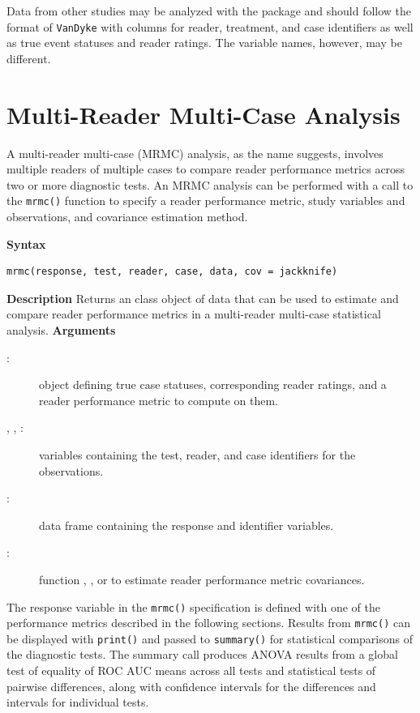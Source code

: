 \documentclass[
]{jss}
\newenvironment{Description}{\textbf{Description}\vspace{0.5em}\newline}{\vspace{0.5em}\newline}
\begin{document}
Data from other studies may be analyzed with the package and should
follow the format of \texttt{VanDyke} with columns for reader,
treatment, and case identifiers as well as true event statuses and
reader ratings. The variable names, however, may be different.

\hypertarget{multi-reader-multi-case-analysis}{%
\section{Multi-Reader Multi-Case
Analysis}\label{multi-reader-multi-case-analysis}}

A multi-reader multi-case (MRMC) analysis, as the name suggests,
involves multiple readers of multiple cases to compare reader
performance metrics across two or more diagnostic tests. An MRMC
analysis can be performed with a call to the \texttt{mrmc()} function to
specify a reader performance metric, study variables and observations,
and covariance estimation method.

\begin{tcolorbox}[title=MRMC Function]
\textbf{Syntax}
\begin{verbatim}
mrmc(response, test, reader, case, data, cov = jackknife)
\end{verbatim}
\begin{Description}
Returns an  class object of data that can be used to estimate and compare reader performance metrics in a multi-reader multi-case statistical analysis.
\end{Description}
\textbf{Arguments}
\begin{description}
\item[:] object defining true case statuses, corresponding reader ratings, and a reader performance metric to compute on them.
\item[, , :] variables containing the test, reader, and case identifiers for the  observations.
\item[:] data frame containing the response and identifier variables.
\item[:] function , , or  to estimate reader performance metric covariances.
\end{description}
\end{tcolorbox}

The response variable in the \texttt{mrmc()} specification is defined
with one of the performance metrics described in the following sections.
Results from \texttt{mrmc()} can be displayed with \texttt{print()} and
passed to \texttt{summary()} for statistical comparisons of the
diagnostic tests. The summary call produces ANOVA results from a global
test of equality of ROC AUC means across all tests and statistical tests
of pairwise differences, along with confidence intervals for the
differences and intervals for individual tests.
\end{document}
